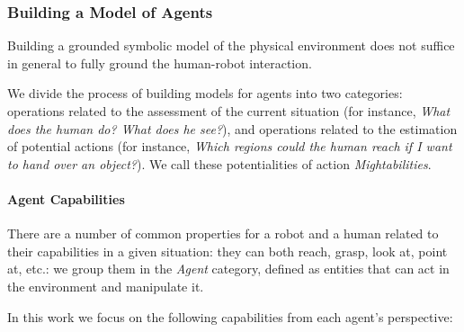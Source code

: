 \subsubsection{Building a Model of Agents}
\label{sect|grounding_agents}

Building a grounded symbolic model of the physical environment does not suffice
in general to fully ground the human-robot interaction.

We divide the process of building models for agents into two categories:
operations related to the assessment of the current situation (for instance,
\emph{What does the human do? What does he see?}), and operations related to
the estimation of potential actions (for instance, \emph{Which regions could
the human reach if I want to hand over an object?}). We call these
potentialities of action \emph{Mightabilities}.

\paragraph{Agent Capabilities}

There are a number of common properties for a robot and a human related to
their capabilities in a given situation: they can both reach, grasp, look at,
point at, etc.: we group them in the \emph{Agent} category, defined as entities
that can act in the environment and manipulate it.

In this work we focus on the following capabilities from each agent's
perspective:

